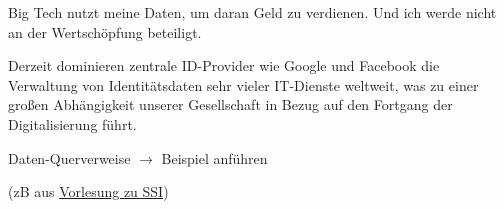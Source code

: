 \vspace{0.3cm}


\begin{Problem}

Big Tech nutzt meine Daten, um daran Geld zu verdienen. Und ich werde nicht an der Wertschöpfung beteiligt.

\end{Problem}

\vspace{0.3cm}


\begin{Problem}

Derzeit dominieren zentrale ID-Provider wie Google und Facebook die Verwaltung von Identitätsdaten sehr vieler IT-Dienste weltweit, was zu einer großen Abhängigkeit unserer Gesellschaft in Bezug auf den Fortgang der Digitalisierung führt.

\end{Problem}

\vspace{0.3cm}


\begin{Problem}

Daten-Querverweise $\rightarrow$ Beispiel anführen 

(zB aus \href{https://norbert-pohlmann.com/glossar-cyber-sicherheit/self-sovereign-identity-ssi/}{Vorlesung zu SSI})

\end{Problem}

\vspace{0.5cm}
